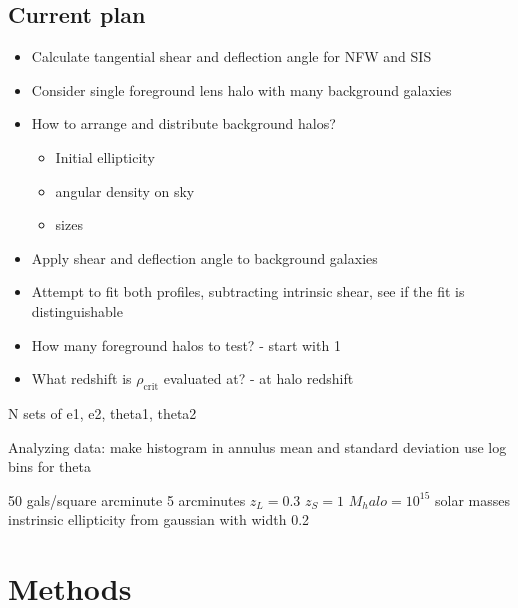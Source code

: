 \documentclass[]{article}
\begin{document}
\subsection{Current plan}
\begin{itemize}
    \item Calculate tangential shear and deflection angle for NFW and SIS
    \item Consider single foreground lens halo with many background galaxies
    \item How to arrange and distribute background halos?
    \begin{itemize}
        \item Initial ellipticity
        \item angular density on sky
        \item sizes
    \end{itemize}
    \item Apply shear and deflection angle to background galaxies
    \item Attempt to fit both profiles, subtracting intrinsic shear, see if the fit is distinguishable
    \item How many foreground halos to test? - start with 1
    \item What redshift is $\rho_\mathrm{crit}$ evaluated at? - at halo redshift

\end{itemize}

N sets of e1, e2, theta1, theta2

Analyzing data:
make histogram in annulus
mean and standard deviation
use log bins for theta


50 gals/square arcminute
5 arcminutes
$z_L = 0.3$
$z_S = 1$
$M_halo = 10^15$ solar masses
instrinsic ellipticity from gaussian with width 0.2


\section{Methods}
\end{document}
